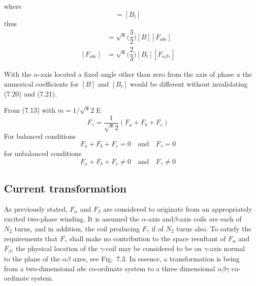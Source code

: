 \documentclass[a4paper,numbers=noenddot,12pt]{scrbook}
\begin{document}
        where
        \begin{equation}
            [B^{-1}] = [B_t]
            \label{eq:Eq7.19}
        \end{equation}
        thus
        \begin{align}
            [F_{\alpha \beta \gamma}]  & = \sqrt*{\Big(\dfrac{3}{2}\Big)}  [B] [F_{abc}] \\
            [F_{abc}]  & =  \sqrt*{\Big(\dfrac{2}{3}\Big)}[B_t][F_{\alpha \beta \gamma}] %
            \label{eq:Eq7.21}
        \end{align}

        With the $\alpha$-axis located a fixed angle other than zero from the axis of phase $a$ the numerical coefficients for $[B]$ and $[B_t]$ would be different without invalidating (7.20) and (7.21).

        From (7.13) with $m = 1 / \sqrt*{2}$
        E\begin{equation}
            F_{\gamma} = \dfrac{1}{\sqrt*{2}}(F_a + F_b + F_c)
            \label{eq:Eq7.22}
        \end{equation}
        For balanced conditions
        \begin{equation*}
            F_a + F_b + F_c = 0 \quad \text{and} \quad F_{\gamma} = 0
        \end{equation*}
        for unbalanced conditions
        \begin{equation*}
            F_a + F_b + F_c \neq 0 \quad \text{and} \quad F_{\gamma} \neq 0
        \end{equation*}

        \subsection{Current transformation}
        As previously stated, $F_{\alpha}$ and $F_{\beta}$ are considered to originate from an appropriately excited two-phase winding. It is assumed the $\alpha$-axis and$\beta$-axis coils are each of $N_2$ turns, and in addition, the coil producing $F_{\gamma}$ if of $N_2$ turns also. To satisfy the requirements that $F_{\gamma}$ shall make no contribution to the space resultant of $F_{\alpha}$ and $F_{\beta}$, the physical location of the
        $\gamma$-coil may be considered to be on $\gamma$-axis normal to the plane of the $\alpha \beta$ axes, see Fig.\ 7.3. In essence, a transformation is being from a two-dimensional $abc$ co-ordinate system to a three dimensional $\alpha \beta \gamma$ co-ordinate system.
\end{document}
